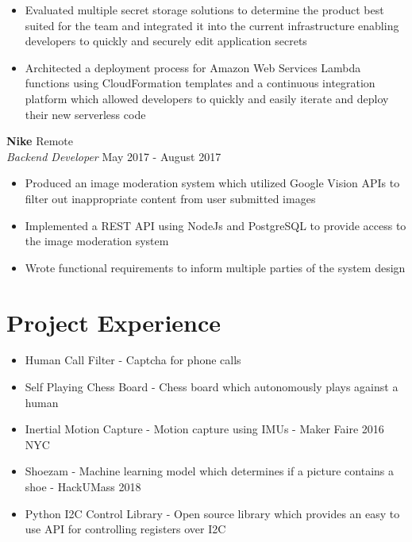 \documentclass[10pt]{article}
\begin{document}
\begin{flushleft}
\begin{itemize}
		\item Evaluated multiple secret storage solutions to determine the product best suited for the team and
			integrated it into the current infrastructure enabling developers to quickly and securely edit 
			application secrets

		\item Architected a deployment process for Amazon Web Services Lambda functions using CloudFormation templates
			and a continuous integration platform which allowed developers to quickly and easily iterate and deploy 
			their new serverless code
	\end{itemize}

	\vspace{0.5em}
	\textbf{Nike} \hfill Remote \\
	\textit{Backend Developer} \hfill May 2017 - August 2017 \\
	\begin{itemize}
		\item Produced an image moderation system which utilized Google Vision APIs to filter out inappropriate content 
		    from user submitted images

		\item Implemented a REST API using NodeJs and PostgreSQL to provide access to the image moderation system

		\item Wrote functional requirements to inform multiple parties of the system design
	\end{itemize}

\section{Project Experience}
	\begin{itemize}
		\item Human Call Filter - Captcha for phone calls

		\item Self Playing Chess Board - Chess board which autonomously plays against a human

		\item Inertial Motion Capture - Motion capture using IMUs - Maker Faire 2016 NYC

		\item Shoezam - Machine learning model which determines if a picture contains a shoe - HackUMass 2018

		\item Python I2C Control Library - Open source library which provides an easy to use API for controlling 
			registers over I2C


\end{itemize}
\end{flushleft}
\end{document}

